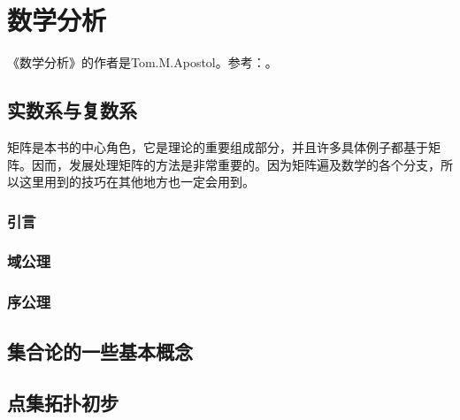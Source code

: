 \part{数学分析}
《数学分析》的作者是Tom.M.Apostol。参考：\cite{MathematicalAnalysisApostol2006}。

\chapter{实数系与复数系}\label{ch00701}
矩阵是本书的中心角色，它是理论的重要组成部分，并且许多具体例子都基于矩阵。因而，发展处理矩阵的方法是非常重要的。因为矩阵遍及数学的各个分支，所以这里用到的技巧在其他地方也一定会用到。

\section{引言}\label{sec0070101}


\section{域公理}\label{sec0070102}


\section{序公理}\label{sec0070103}



\chapter{集合论的一些基本概念}\label{ch00702}


\chapter{点集拓扑初步}\label{ch00703}











